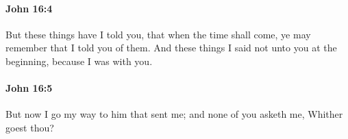 		\paragraph{John 16:4} %
			\label{JOHN-16-4}

			But these things have I told you, that when the time shall come, ye may remember that I told you of them. And these things I said not unto you at the beginning, because I was with you.

			\begin{framed}
				\scriptsize
				\begin{compactdesc}
					\item[SBLG] 
				\end{compactdesc}
			\end{framed}

		\paragraph{John 16:5} %
			\label{JOHN-16-5}

			But now I go my way to him that sent me; and none of you asketh me, Whither goest thou?

